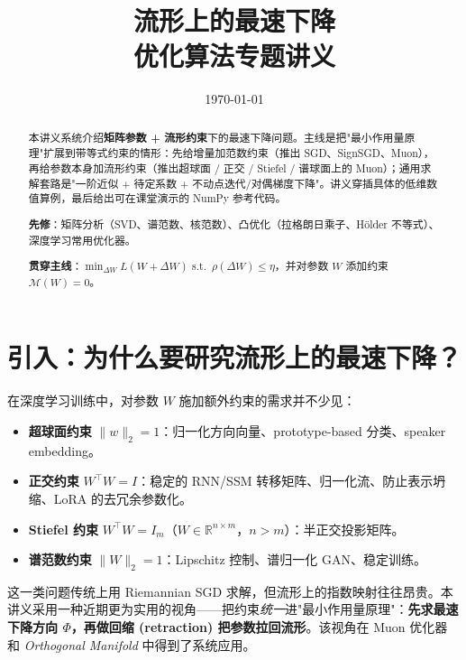 \documentclass[11pt,a4paper]{article}
\title{\textbf{流形上的最速下降}\\[6pt]
\large 优化算法专题讲义}
\author{}
\date{\today}
\theoremstyle{mythm}
\theoremstyle{mydef}
\newcommand{\R}{\mathbb{R}}
\begin{document}
\maketitle
\thispagestyle{empty}

\begin{abstract}
本讲义系统介绍\textbf{矩阵参数 + 流形约束}下的最速下降问题。主线是把"最小作用量原理"扩展到带等式约束的情形：先给增量加范数约束（推出 SGD、SignSGD、Muon），再给参数本身加流形约束（推出超球面 / 正交 / Stiefel / 谱球面上的 Muon）；通用求解套路是"一阶近似 + 待定系数 + 不动点迭代/对偶梯度下降"。讲义穿插具体的低维数值算例，最后给出可在课堂演示的 NumPy 参考代码。

\medskip
\noindent\textbf{先修}：矩阵分析（SVD、谱范数、核范数）、凸优化（拉格朗日乘子、Hölder 不等式）、深度学习常用优化器。

\noindent\textbf{贯穿主线}：$\min_{\Delta W} L(W+\Delta W)$ s.t.\ $\rho(\Delta W)\le \eta$，并对参数 $W$ 添加约束 $\mathcal{M}(W)=0$。
\end{abstract}

\tableofcontents
\newpage

\section{引入：为什么要研究流形上的最速下降？}

在深度学习训练中，对参数 $W$ 施加额外约束的需求并不少见：
\begin{itemize}[leftmargin=2em]
    \item \textbf{超球面约束} $\|w\|_2 = 1$：归一化方向向量、prototype-based 分类、speaker embedding。
    \item \textbf{正交约束} $W^\top W = I$：稳定的 RNN/SSM 转移矩阵、归一化流、防止表示坍缩、LoRA 的去冗余参数化。
    \item \textbf{Stiefel 约束} $W^\top W = I_m$（$W \in \R^{n\times m}$，$n>m$）：半正交投影矩阵。
    \item \textbf{谱范数约束} $\|W\|_2 = 1$：Lipschitz 控制、谱归一化 GAN、稳定训练。
\end{itemize}
这一类问题传统上用 Riemannian SGD 求解，但流形上的指数映射往往昂贵。本讲义采用一种近期更为实用的视角——把约束\emph{统一}进"最小作用量原理"：\textbf{先求最速下降方向 $\Phi$，再做回缩 (retraction) 把参数拉回流形}。该视角在 Muon 优化器\cite{muon} 和 \emph{Orthogonal Manifold} \cite{bernstein-orth} 中得到了系统应用。
\end{document}
